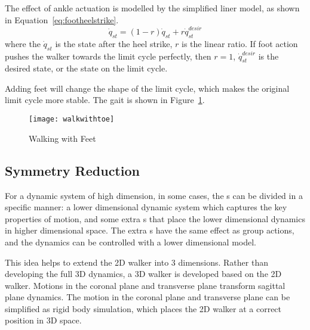 The effect of ankle actuation is modelled by the simplified liner model, as shown in Equation~\ref{eq:footheelstrike}.
\begin{equation}
\label{eq:footheelstrike}
\dot{q}_{st}=(1-r)\dot{q}_{st}+r\dot{q}^{desir}_{st}
\end{equation}
where the $\dot{q}_{st}$ is the state after the heel strike,
$r$ is the linear ratio.
If foot action pushes the walker towards the limit cycle perfectly, then $r=1$,
$\dot{q}^{desir}_{st}$ is the desired state, or the state on the limit cycle.


Adding feet will change the shape of the limit cycle, which makes the original limit cycle more stable.
The gait is shown in Figure~\ref{fig:ToeGait}.
\begin{figure}[!htbp]
  \begin{center}
      \texttt{[image: walkwithtoe]}
    \caption{Walking with Feet}
    \label{fig:ToeGait}
\end{center}
\end{figure}






\subsection{Symmetry Reduction}
For a dynamic system of high dimension, in some cases, the {\dof}s can be divided in a specific manner:
a lower dimensional dynamic system which captures the key properties of motion, 
and some extra {\dof}s that place the lower dimensional dynamics in higher dimensional space.
The extra {\dof}s have the same effect as group actions, and the dynamics can be controlled with a lower dimensional model.



This idea helps to extend the 2D walker into 3 dimensions.
Rather than developing the full 3D dynamics, a 3D walker is developed based on the 2D walker.
Motions in the coronal plane and transverse plane transform sagittal plane dynamics.
The motion in the coronal plane and transverse plane can be simplified as rigid body simulation, which places the 2D walker at a correct position in 3D space.

